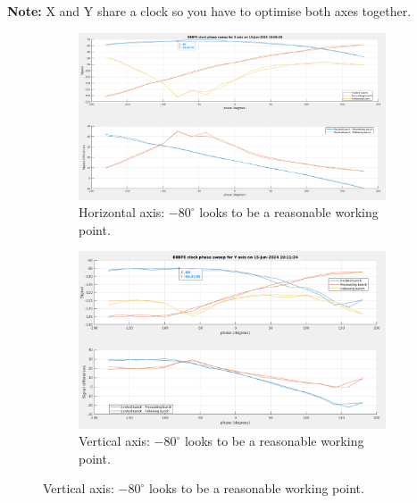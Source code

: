 \documentclass{report}
\begin{document}
\textbf{Note:} X and Y share a clock so you have to optimise both axes together.

\begin{figure}[hbt]
   \centering
    \begin{subfigure}[b]{0.48\textwidth}
        \includegraphics[width=\textwidth]{vlr_clock_phase_scan_x.png}
        \caption{Horizontal axis: $-80^\circ$ looks to be a reasonable working point.}
        \label{fig:frontend_clock_phase_scan_x}
    \end{subfigure}
    \begin{subfigure}[b]{0.48\textwidth}
        \includegraphics[width=\textwidth]{vlr_clock_phase_scan_y.png}
        \caption{Vertical axis: $-80^\circ$ looks to be a reasonable working point.}
        \label{fig:frontend_clock_phase_scan_y}
    \end{subfigure}
    

\end{figure}
\end{document}
